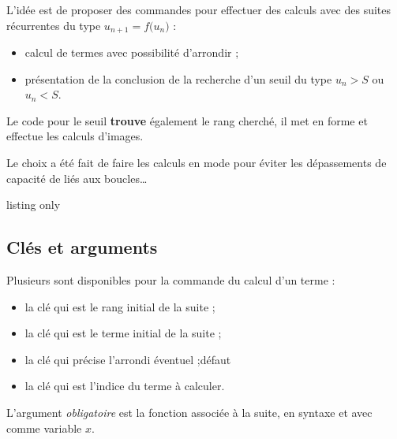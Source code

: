 \begin{tipblock}
 L'idée est de proposer des commandes pour effectuer des calculs avec des suites récurrentes du type $u_{n+1}=f\big(u_n\big)$ :

\begin{itemize}
	\item calcul de termes avec possibilité d'arrondir ;
	\item présentation de la conclusion de la recherche d'un seuil du type $u_n > S$ ou $u_n < S$.
\end{itemize}
\vspace*{-\baselineskip}\leavevmode
\end{tipblock}

\begin{warningblock}
 Le code pour le seuil \textbf{trouve} également le rang cherché, il met en forme et effectue les calculs d'images.

\smallskip

 Le choix a été fait de faire les calculs en mode  pour éviter les dépassements de capacité de  liés aux boucles\ldots
\end{warningblock}

\begin{PresCodeTexPL}{listing only}

\end{PresCodeTexPL}

\subsection{Clés et arguments}

\begin{cautionblock}
Plusieurs  sont disponibles pour la commande du calcul d'un terme :

\begin{itemize}
	\item la clé  qui est le rang initial de la suite ;
	\item la clé  qui est le terme initial de la suite ;
	\item la clé  qui précise l'arrondi éventuel ;\hfill{}défaut 
	\item la clé  qui est l'indice du terme à calculer.
\end{itemize}

\smallskip

L'argument \textit{obligatoire} est la fonction associée à la suite, en syntaxe  et avec comme variable $x$.
\end{cautionblock}

